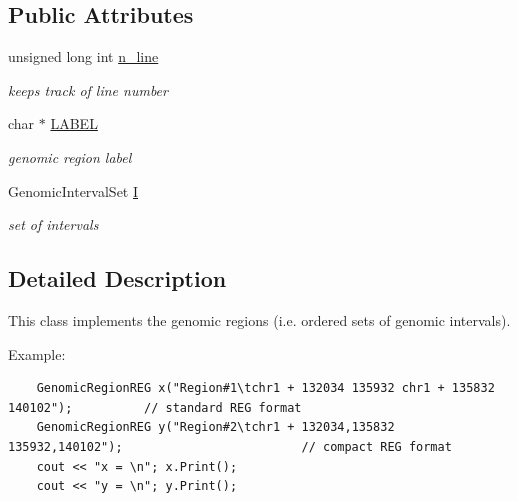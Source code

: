 \subsection*{Public Attributes}
\begin{CompactItemize}
\item 
\hypertarget{classGenomicRegion_efe2255aeed5338060190ded05cb9c0c}{
unsigned long int \hyperlink{classGenomicRegion_efe2255aeed5338060190ded05cb9c0c}{n\_\-line}}
\label{classGenomicRegion_efe2255aeed5338060190ded05cb9c0c}

\begin{CompactList}\small\item\em keeps track of line number \item\end{CompactList}\item 
\hypertarget{classGenomicRegion_7eeba95c1e87e100346688681e30ff24}{
char $\ast$ \hyperlink{classGenomicRegion_7eeba95c1e87e100346688681e30ff24}{LABEL}}
\label{classGenomicRegion_7eeba95c1e87e100346688681e30ff24}

\begin{CompactList}\small\item\em genomic region label \item\end{CompactList}\item 
\hypertarget{classGenomicRegion_b10b86b03c258958818b00c21e3672a9}{
GenomicIntervalSet \hyperlink{classGenomicRegion_b10b86b03c258958818b00c21e3672a9}{I}}
\label{classGenomicRegion_b10b86b03c258958818b00c21e3672a9}

\begin{CompactList}\small\item\em set of intervals \item\end{CompactList}\end{CompactItemize}


\subsection{Detailed Description}
This class implements the genomic regions (i.e. ordered sets of genomic intervals). 

Example: 

\begin{Code}\begin{verbatim}    GenomicRegionREG x("Region#1\tchr1 + 132034 135932 chr1 + 135832 140102");          // standard REG format
    GenomicRegionREG y("Region#2\tchr1 + 132034,135832 135932,140102");                         // compact REG format
    cout << "x = \n"; x.Print();
    cout << "y = \n"; y.Print(); 
\end{verbatim}
\end{Code}

